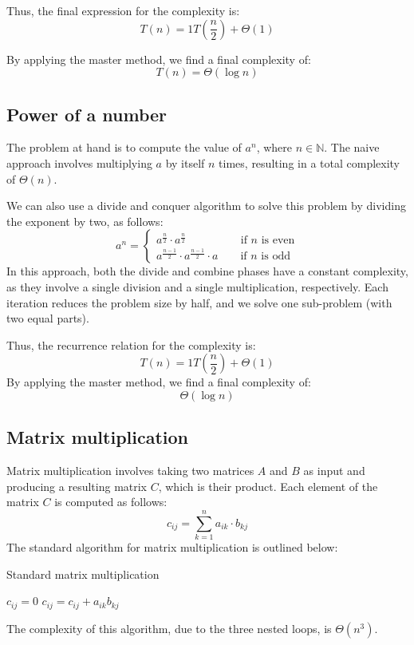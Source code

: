 Thus, the final expression for the complexity is:
\[T(n)=1T\left(\dfrac{n}{2}\right)+\Theta(1)\]

By applying the master method, we find a final complexity of:
\[T(n)=\Theta(\log n)\]

\subsection{Power of a number}

The problem at hand is to compute the value of $a^n$, where $n\in\mathbb{N}$. 
The naive approach involves multiplying $a$ by itself $n$ times, resulting in a total complexity of $\Theta(n)$. 

We can also use a divide and conquer algorithm to solve this problem by dividing the exponent by two, as follows:
\[a^n=\begin{cases} a^\frac{n}{2}\cdot a^\frac{n}{2}  \:\:\:\:\qquad\qquad \text{if }n\text{ is even} \\ a^\frac{n-1}{2}\cdot a^\frac{n-1}{2} \cdot a \qquad \text{if }n\text{ is odd} \end{cases}\]
In this approach, both the divide and combine phases have a constant complexity, as they involve a single division and a single multiplication, respectively. 
Each iteration reduces the problem size by half, and we solve one sub-problem (with two equal parts).

Thus, the recurrence relation for the complexity is:
\[T(n)=1T\left(\dfrac{n}{2}\right)+\Theta(1)\]
By applying the master method, we find a final complexity of:
\[\Theta(\log n)\]

\subsection{Matrix multiplication}
Matrix multiplication involves taking two matrices $A$ and $B$ as input and producing a resulting matrix $C$, which is their product.
Each element of the matrix $C$ is computed as follows:
\[c_{ij}=\sum_{k=1}^{n}a_{ik}\cdot b_{kj}\]
The standard algorithm for matrix multiplication is outlined below:
\begin{algorithm}[H]
    \caption{Standard matrix multiplication}
        \begin{algorithmic}[1]
                    \State $c_{ij} = 0$
                        \State $c_{ij} = c_{ij}+a_{ik} b_{kj}$
                    \EndFor
                \EndFor
            \EndFor
        \end{algorithmic}
\end{algorithm}
The complexity of this algorithm, due to the three nested loops, is $\Theta(n^3)$.

